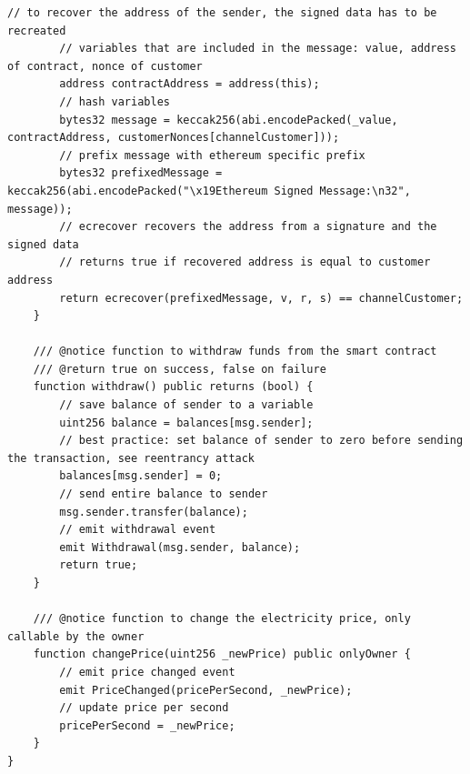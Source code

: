 \begin{lstlisting}[language=Solidity, caption={Payment channel smart contract}, label={lis:pc_sc}]
        // to recover the address of the sender, the signed data has to be recreated
        // variables that are included in the message: value, address of contract, nonce of customer
        address contractAddress = address(this);
        // hash variables
        bytes32 message = keccak256(abi.encodePacked(_value, contractAddress, customerNonces[channelCustomer]));
        // prefix message with ethereum specific prefix
        bytes32 prefixedMessage = keccak256(abi.encodePacked("\x19Ethereum Signed Message:\n32", message));
        // ecrecover recovers the address from a signature and the signed data
        // returns true if recovered address is equal to customer address
        return ecrecover(prefixedMessage, v, r, s) == channelCustomer;
    }

    /// @notice function to withdraw funds from the smart contract
    /// @return true on success, false on failure
    function withdraw() public returns (bool) {
        // save balance of sender to a variable
        uint256 balance = balances[msg.sender];
        // best practice: set balance of sender to zero before sending the transaction, see reentrancy attack
        balances[msg.sender] = 0;
        // send entire balance to sender
        msg.sender.transfer(balance);
        // emit withdrawal event
        emit Withdrawal(msg.sender, balance);
        return true;
    }

    /// @notice function to change the electricity price, only callable by the owner
    function changePrice(uint256 _newPrice) public onlyOwner {
        // emit price changed event
        emit PriceChanged(pricePerSecond, _newPrice);
        // update price per second
        pricePerSecond = _newPrice;
    }
}
\end{lstlisting}